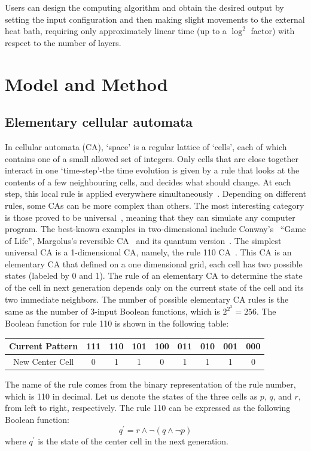 \documentclass[twocolumn,superscriptaddress,english,showpacs,longbibliography]{revtex4-2}
\begin{document}
Users can design the computing algorithm and obtain the desired output by setting the input configuration and then making slight movements to the external heat bath, requiring only approximately linear time (up to a $\log^2$ factor) with respect to the number of layers.

\section{Model and Method}\label{sec:model-method}

\subsection{Elementary cellular automata}\label{elementary-cellular-automata}
In cellular automata (CA), `space' is a regular lattice of `cells', each of which contains one of a small allowed set of integers.
Only cells that are close together interact in one `time-step'-the time evolution is given by a rule that looks at the contents of a few neighbouring cells, and decides what should change. At each step, this local rule is applied everywhere simultaneously~\cite{}.
Depending on different rules, some CAs can be more complex than others.
The most interesting category is those proved to be universal~\cite{Berlekamp2004}, meaning that they can simulate any computer program. The best-known examples in two-dimensional include Conway's~\cite{Games1970} ``Game of Life'', Margolus's reversible CA~\cite{Margolus1984} and its quantum version~\cite{Arrighi2012}.
The simplest universal CA is a 1-dimensional CA, namely, the rule 110 CA~\cite{Cook2009}.
This CA is an elementary CA that defined on a one dimensional grid, each cell has two possible states (labeled by 0 and 1). The rule of an elementary CA to determine the state of the cell in next generation depends only on the current state of the cell and its two immediate neighbors. The number of possible elementary CA rules is the same as the number of 3-input Boolean functions, which is $2^{2^3} = 256$. The Boolean function for rule 110 is shown in the following table:

\begin{tabular}{|c|c|c|c|c|c|c|c|c|}
\hline
Current Pattern & 111 & 110 & 101 & 100 & 011 & 010 & 001 & 000 \\
\hline
New Center Cell & 0 & 1 & 1 & 0 & 1 & 1 & 1 & 0 \\
\hline
\end{tabular}

The name of the rule comes from the binary representation of the rule number, which is 110 in decimal.
Let us denote the states of the three cells as $p$, $q$, and $r$, from left to right, respectively. The rule 110 can be expressed as the following Boolean function:
\begin{equation}\label{eq:110rule}
    q^\prime = r \land \neg (q \land \neg p)
\end{equation}
where $q^\prime$ is the state of the center cell in the next generation.
\end{document}
